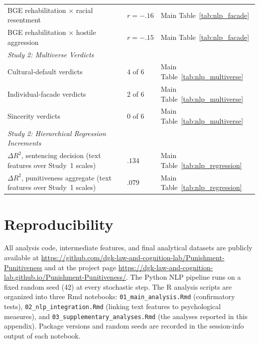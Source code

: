 \begin{table}[htbp]
\begin{tabular}{lll}
    BGE rehabilitation $\times$ racial resentment          & $r = -.16$ & Main Table~\ref{tab:nlp_facade} \\
    BGE rehabilitation $\times$ hostile aggression         & $r = -.15$ & Main Table~\ref{tab:nlp_facade} \\
    \addlinespace
    \textit{Study 2: Multiverse Verdicts} \\
    Cultural-default verdicts                              & 4 of 6 & Main Table~\ref{tab:nlp_multiverse} \\
    Individual-facade verdicts                             & 2 of 6 & Main Table~\ref{tab:nlp_multiverse} \\
    Sincerity verdicts                                     & 0 of 6 & Main Table~\ref{tab:nlp_multiverse} \\
    \addlinespace
    \textit{Study 2: Hierarchical Regression Increments} \\
    $\Delta R^2$, sentencing decision (text features over Study~1 scales)   & $.134$ & Main Table~\ref{tab:nlp_regression} \\
    $\Delta R^2$, punitiveness aggregate (text features over Study~1 scales) & $.079$ & Main Table~\ref{tab:nlp_regression} \\
    \bottomrule
  \end{tabular}
\end{table}

\section{Reproducibility}

All analysis code, intermediate features, and final analytical datasets are publicly available at \url{https://github.com/dgk-law-and-cognition-lab/Punishment-Punitiveness} and at the project page \url{https://dgk-law-and-cognition-lab.github.io/Punishment-Punitiveness/}. The Python NLP pipeline runs on a fixed random seed (42) at every stochastic step. The R analysis scripts are organized into three Rmd notebooks: \texttt{01\_main\_analysis.Rmd} (confirmatory tests), \texttt{02\_nlp\_integration.Rmd} (linking text features to psychological measures), and \texttt{03\_supplementary\_analyses.Rmd} (the analyses reported in this appendix). Package versions and random seeds are recorded in the session-info output of each notebook.

